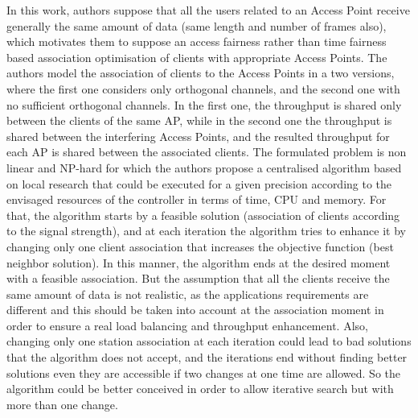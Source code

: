 \documentclass[journal,transmag]{IEEEtran}
\begin{document}
In this work, authors suppose that all the users related to an Access Point receive generally the same amount of data (same length and number of frames also), which motivates them to suppose an access fairness rather than time fairness based association optimisation of clients with appropriate Access Points. The authors model the association of clients to the Access Points in a two versions, where the first one considers only orthogonal channels, and the second one with no sufficient orthogonal channels. In the first one, the throughput is shared only between the clients of the same AP, while in the second one the throughput is shared between the interfering Access Points, and the resulted throughput for each AP is shared between the associated clients. The formulated problem is non linear and NP-hard for which the authors propose a centralised algorithm based on local research that could be executed for a given precision according to the envisaged resources of the controller in terms of time, CPU and memory. For that, the algorithm starts by a feasible solution (association of clients according to the signal strength), and at each iteration the algorithm tries to enhance it by changing only one client association that increases the objective function (best neighbor solution). In this manner, the algorithm ends at the desired moment with a feasible association. But the assumption that all the clients receive the same amount of data is not realistic, as the applications requirements are different and this should be taken into account at the association moment in order to ensure a real load balancing and throughput enhancement. Also, changing only one station association at each iteration could lead to bad solutions that the algorithm does not accept, and the iterations end without finding better solutions even they are accessible if two changes at one time are allowed. So the algorithm could be better conceived in order to allow iterative search but with more than one change. \\ 
\end{document}
